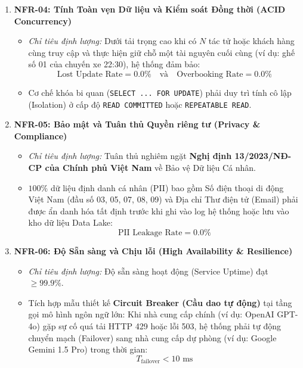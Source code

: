 \begin{enumerate}
    \item \textbf{NFR-04: Tính Toàn vẹn Dữ liệu và Kiểm soát Đồng thời (ACID Concurrency)}
    \begin{itemize}
        \item \textit{Chỉ tiêu định lượng:} Dưới tải trọng cao khi có $N$ tác tử hoặc khách hàng cùng truy cập và thực hiện giữ chỗ một tài nguyên cuối cùng (ví dụ: ghế số 01 của chuyến xe 22:30), hệ thống đảm bảo:
        \begin{equation}
        \text{Lost Update Rate} = 0.0\% \quad \text{và} \quad \text{Overbooking Rate} = 0.0\%
        \end{equation}
        \item Cơ chế khóa bi quan (\texttt{SELECT ... FOR UPDATE}) phải duy trì tính cô lập (Isolation) ở cấp độ \texttt{READ COMMITTED} hoặc \texttt{REPEATABLE READ}.
    \end{itemize}

    \item \textbf{NFR-05: Bảo mật và Tuân thủ Quyền riêng tư (Privacy \& Compliance)}
    \begin{itemize}
        \item \textit{Chỉ tiêu định lượng:} Tuân thủ nghiêm ngặt \textbf{Nghị định 13/2023/NĐ-CP của Chính phủ Việt Nam} về Bảo vệ Dữ liệu Cá nhân.
        \item $100\%$ dữ liệu định danh cá nhân (PII) bao gồm Số điện thoại di động Việt Nam (đầu số 03, 05, 07, 08, 09) và Địa chỉ Thư điện tử (Email) phải được ẩn danh hóa tất định trước khi ghi vào log hệ thống hoặc lưu vào kho dữ liệu Data Lake:
        \begin{equation}
        \text{PII Leakage Rate} = 0.0\%
        \end{equation}
    \end{itemize}

    \item \textbf{NFR-06: Độ Sẵn sàng và Chịu lỗi (High Availability \& Resilience)}
    \begin{itemize}
        \item \textit{Chỉ tiêu định lượng:} Độ sẵn sàng hoạt động (Service Uptime) đạt $\ge 99.9\%$.
        \item Tích hợp mẫu thiết kế \textbf{Circuit Breaker (Cầu dao tự động)} tại tầng gọi mô hình ngôn ngữ lớn: Khi nhà cung cấp chính (ví dụ: OpenAI GPT-4o) gặp sự cố quá tải HTTP 429 hoặc lỗi 503, hệ thống phải tự động chuyển mạch (Failover) sang nhà cung cấp dự phòng (ví dụ: Google Gemini 1.5 Pro) trong thời gian:
        \begin{equation}
        T_{\text{failover}} < 10\text{ ms}
        \end{equation}
    \end{itemize}
\end{enumerate}
